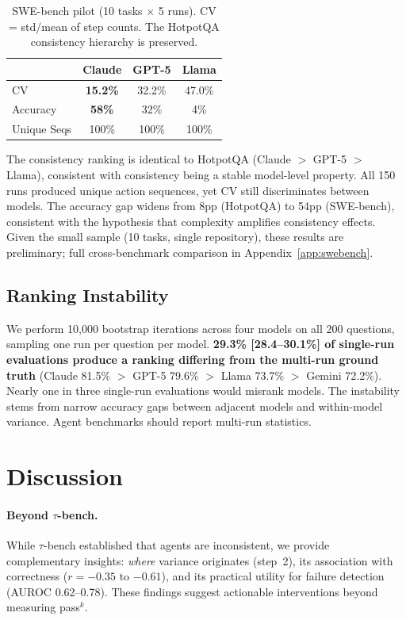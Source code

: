 \documentclass{article}
\begin{document}
\begin{table}[h]
\centering
\small
\caption{SWE-bench pilot (10 tasks $\times$ 5 runs). CV = std/mean of step counts. The HotpotQA consistency hierarchy is preserved.}
\label{tab:swebench}
\begin{tabular}{lccc}
\toprule
& \textbf{Claude} & \textbf{GPT-5} & \textbf{Llama} \\
\midrule
CV & \textbf{15.2\%} & 32.2\% & 47.0\% \\
Accuracy & \textbf{58\%} & 32\% & 4\% \\
Unique Seqs & 100\% & 100\% & 100\% \\
\bottomrule
\end{tabular}
\end{table}

The consistency ranking is identical to HotpotQA (Claude $>$ GPT-5 $>$ Llama), consistent with consistency being a stable model-level property. All 150 runs produced unique action sequences, yet CV still discriminates between models. The accuracy gap widens from 8pp (HotpotQA) to 54pp (SWE-bench), consistent with the hypothesis that complexity amplifies consistency effects. Given the small sample (10 tasks, single repository), these results are preliminary; full cross-benchmark comparison in Appendix~\ref{app:swebench}.

\subsection{Ranking Instability}
\label{sec:rankings}

We perform 10,000 bootstrap iterations across four models on all 200 questions, sampling one run per question per model. \textbf{29.3\% [28.4--30.1\%] of single-run evaluations produce a ranking differing from the multi-run ground truth} (Claude 81.5\% $>$ GPT-5 79.6\% $>$ Llama 73.7\% $>$ Gemini 72.2\%). Nearly one in three single-run evaluations would misrank models. The instability stems from narrow accuracy gaps between adjacent models and within-model variance. Agent benchmarks should report multi-run statistics.

\section{Discussion}

\paragraph{Beyond $\tau$-bench.}
While $\tau$-bench \citep{yao2024tau} established that agents are inconsistent, we provide complementary insights: \emph{where} variance originates (step~2), its association with correctness ($r=-0.35$ to $-0.61$), and its practical utility for failure detection (AUROC 0.62--0.78). These findings suggest actionable interventions beyond measuring pass$^k$.
\end{document}
